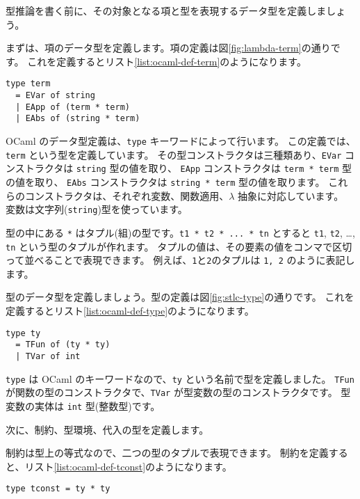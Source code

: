 型推論を書く前に、その対象となる項と型を表現するデータ型を定義しましょう。

まずは、項のデータ型を定義します。項の定義は図\ref{fig:lambda-term}の通りです。
これを定義するとリスト\ref{list:ocaml-def-term}のようになります。

\begin{lstlisting}[caption=項の定義, label=list:ocaml-def-term]
type term
  = EVar of string
  | EApp of (term * term)
  | EAbs of (string * term)
\end{lstlisting}

OCaml のデータ型定義は、\texttt{type} キーワードによって行います。
この定義では、\texttt{term} という型を定義しています。
その型コンストラクタは三種類あり、\texttt{EVar} コンストラクタは \texttt{string} 型の値を取り、
\texttt{EApp} コンストラクタは \texttt{term * term} 型の値を取り、
\texttt{EAbs} コンストラクタは \texttt{string * term} 型の値を取ります。
これらのコンストラクタは、それぞれ変数、関数適用、$\lambda$ 抽象に対応しています。
変数は文字列(\texttt{string})型を使っています。

型の中にある \texttt{*} はタプル(組)の型です。\texttt{t1 * t2 * ... * tn} とすると
\texttt{t1}, \texttt{t2}, \dots, \texttt{tn} という型のタプルが作れます。
タプルの値は、その要素の値をコンマで区切って並べることで表現できます。
例えば、\texttt{1}と\texttt{2}のタプルは \texttt{1, 2} のように表記します。

型のデータ型を定義しましょう。型の定義は図\ref{fig:stlc-type}の通りです。
これを定義するとリスト\ref{list:ocaml-def-type}のようになります。

\begin{lstlisting}[caption=型の定義, label=list:ocaml-def-type]
type ty
  = TFun of (ty * ty)
  | TVar of int
\end{lstlisting}

\texttt{type} は OCaml のキーワードなので、\texttt{ty} という名前で型を定義しました。
\texttt{TFun} が関数の型のコンストラクタで、\texttt{TVar} が型変数の型のコンストラクタです。
型変数の実体は \texttt{int} 型(整数型)です。

次に、制約、型環境、代入の型を定義します。

制約は型上の等式なので、二つの型のタプルで表現できます。
制約を定義すると、リスト\ref{list:ocaml-def-tconst}のようになります。

\begin{lstlisting}[caption=制約の定義, label=list:ocaml-def-tconst]
type tconst = ty * ty
\end{lstlisting}

